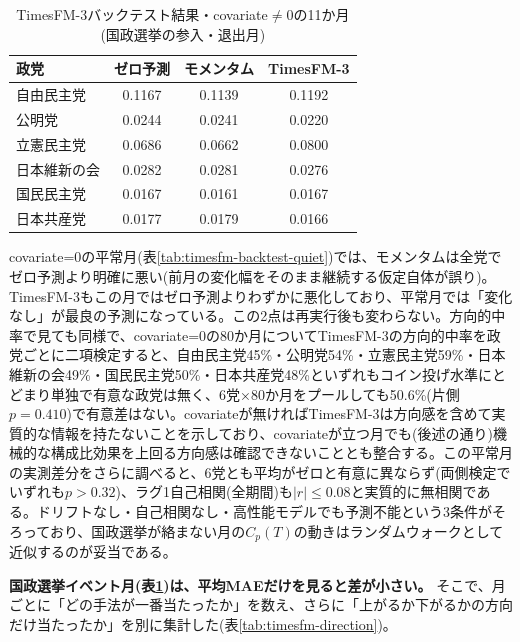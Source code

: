 \documentclass[a4paper,11pt]{ltjsarticle}
\begin{document}
\begin{table}[h]
\centering
\small
\caption{TimesFM-3バックテスト結果・covariate$\neq$0の11か月(国政選挙の参入・退出月)}
\label{tab:timesfm-backtest-event}
\begin{tabular}{lccc}
\toprule
政党 & ゼロ予測 & モメンタム & TimesFM-3 \\
\midrule
自由民主党 & 0.1167 & 0.1139 & 0.1192 \\
公明党 & 0.0244 & 0.0241 & 0.0220 \\
立憲民主党 & 0.0686 & 0.0662 & 0.0800 \\
日本維新の会 & 0.0282 & 0.0281 & 0.0276 \\
国民民主党 & 0.0167 & 0.0161 & 0.0167 \\
日本共産党 & 0.0177 & 0.0179 & 0.0166 \\
\bottomrule
\end{tabular}
\end{table}

covariate=0の平常月(表\ref{tab:timesfm-backtest-quiet})では、モメンタムは全党でゼロ予測より明確に悪い(前月の変化幅をそのまま継続する仮定自体が誤り)。TimesFM-3もこの月ではゼロ予測よりわずかに悪化しており、平常月では「変化なし」が最良の予測になっている。この2点は再実行後も変わらない。方向的中率で見ても同様で、covariate=0の80か月についてTimesFM-3の方向的中率を政党ごとに二項検定すると、自由民主党45\%・公明党54\%・立憲民主党59\%・日本維新の会49\%・国民民主党50\%・日本共産党48\%といずれもコイン投げ水準にとどまり単独で有意な政党は無く、6党×80か月をプールしても50.6\%(片側$p=0.410$)で有意差はない。covariateが無ければTimesFM-3は方向感を含めて実質的な情報を持たないことを示しており、covariateが立つ月でも(後述の通り)機械的な構成比効果を上回る方向感は確認できないこととも整合する。この平常月の実測差分をさらに調べると、6党とも平均がゼロと有意に異ならず(両側検定でいずれも$p>0.32$)、ラグ1自己相関(全期間)も$|r|\leq0.08$と実質的に無相関である。ドリフトなし・自己相関なし・高性能モデルでも予測不能という3条件がそろっており、国政選挙が絡まない月の$C_p(T)$の動きはランダムウォークとして近似するのが妥当である。

\textbf{国政選挙イベント月(表\ref{tab:timesfm-backtest-event})は、平均MAEだけを見ると差が小さい。} そこで、月ごとに「どの手法が一番当たったか」を数え、さらに「上がるか下がるかの方向だけ当たったか」を別に集計した(表\ref{tab:timesfm-direction})。
\end{document}
